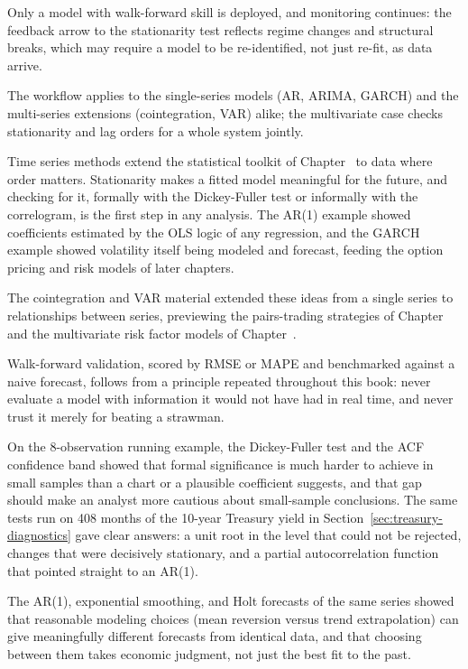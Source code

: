 \documentclass[../ai_in_finance]{subfiles}
\begin{document}
Only a model with walk-forward skill is deployed, and monitoring continues: the feedback arrow to the stationarity test reflects regime changes and structural breaks, which may require a model to be re-identified, not just re-fit, as data arrive.

The workflow applies to the single-series models (AR, ARIMA, GARCH) and the multi-series extensions (cointegration, VAR) alike; the multivariate case checks stationarity and lag orders for a whole system jointly.


Time series methods extend the statistical toolkit of Chapter~ to data where order matters. Stationarity makes a fitted model meaningful for the future, and checking for it, formally with the Dickey-Fuller test or informally with the correlogram, is the first step in any analysis. The AR(1) example showed coefficients estimated by the OLS logic of any regression, and the GARCH example showed volatility itself being modeled and forecast, feeding the option pricing and risk models of later chapters.

The cointegration and VAR material extended these ideas from a single series to relationships between series, previewing the pairs-trading strategies of Chapter~ and the multivariate risk factor models of Chapter~.

Walk-forward validation, scored by RMSE or MAPE and benchmarked against a naive forecast, follows from a principle repeated throughout this book: never evaluate a model with information it would not have had in real time, and never trust it merely for beating a strawman.

On the 8-observation running example, the Dickey-Fuller test and the ACF confidence band showed that formal significance is much harder to achieve in small samples than a chart or a plausible coefficient suggests, and that gap should make an analyst more cautious about small-sample conclusions. The same tests run on 408 months of the 10-year Treasury yield in Section~\ref{sec:treasury-diagnostics} gave clear answers: a unit root in the level that could not be rejected, changes that were decisively stationary, and a partial autocorrelation function that pointed straight to an AR(1).

The AR(1), exponential smoothing, and Holt forecasts of the same series showed that reasonable modeling choices (mean reversion versus trend extrapolation) can give meaningfully different forecasts from identical data, and that choosing between them takes economic judgment, not just the best fit to the past.
\end{document}
